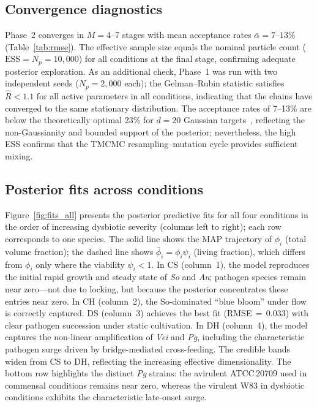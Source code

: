 \documentclass[11pt,a4paper]{article}
\begin{document}
\subsection{Convergence diagnostics}

Phase~2 converges in $M=4$--$7$ stages with mean acceptance rates $\bar{\alpha}=7$--$13$\% (Table~\ref{tab:rmse}).
The effective sample size equals the nominal particle count ($\mathrm{ESS}=N_p=10{,}000$) for all conditions at the final stage, confirming adequate posterior exploration.
As an additional check, Phase~1 was run with two independent seeds ($N_p=2{,}000$ each); the Gelman--Rubin statistic satisfies $\hat{R}<1.1$ for all active parameters in all conditions, indicating that the chains have converged to the same stationary distribution.
The acceptance rates of 7--13\% are below the theoretically optimal 23\% for $d=20$ Gaussian targets~\cite{RobertCasella2004MonteCarlo}, reflecting the non-Gaussianity and bounded support of the posterior; nevertheless, the high ESS confirms that the TMCMC resampling--mutation cycle provides sufficient mixing.

\subsection{Posterior fits across conditions}

Figure~\ref{fig:fits_all} presents the posterior predictive fits for all four conditions in the order of increasing dysbiotic severity (columns left to right); each row corresponds to one species.
The solid line shows the MAP trajectory of $\phi_i$ (total volume fraction); the dashed line shows $\bar{\phi}_i=\phi_i\psi_i$ (living fraction), which differs from $\phi_i$ only where the viability $\psi_i<1$.
In CS (column~1), the model reproduces the initial rapid growth and steady state of \textit{So} and \textit{An}; pathogen species remain near zero---not due to locking, but because the posterior concentrates these entries near zero.
In CH (column~2), the So-dominated ``blue bloom'' under flow is correctly captured.
DS (column~3) achieves the best fit (RMSE\,$=$\,0.033) with clear pathogen succession under static cultivation.
In DH (column~4), the model captures the non-linear amplification of \textit{Vei} and \textit{Pg}, including the characteristic pathogen surge driven by bridge-mediated cross-feeding.
The credible bands widen from CS to DH, reflecting the increasing effective dimensionality.
The bottom row highlights the distinct \textit{Pg} strains: the avirulent ATCC\,20709 used in commensal conditions remains near zero, whereas the virulent W83 in dysbiotic conditions exhibits the characteristic late-onset surge.
\end{document}
